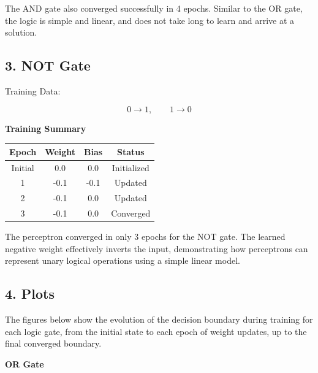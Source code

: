 \documentclass[11pt]{article}
\begin{document}
The AND gate also converged successfully in 4 epochs. Similar to the OR gate, the logic is simple and linear, and does not take long to learn and arrive at a solution.

\vspace{5mm}


\subsection*{3. NOT Gate}

Training Data:

\[
0\rightarrow1,\qquad1\rightarrow0
\]

\vspace{2mm}

\textbf{Training Summary}

\begin{center}
\begin{tabular}{|c|c|c|c|}
\hline
Epoch & Weight & Bias & Status\\
\hline
Initial & 0.0 & 0.0 & Initialized\\
\hline
1 & -0.1 & -0.1 & Updated\\
\hline
2 & -0.1 & 0.0 & Updated\\
\hline
3 & -0.1 & 0.0 & Converged\\
\hline
\end{tabular}
\end{center}

The perceptron converged in only 3 epochs for the NOT gate. The learned negative weight effectively inverts the input, demonstrating how perceptrons can represent unary logical operations using a simple linear model.

\vspace{5mm}


\subsection*{4. Plots}

The figures below show the evolution of the decision boundary during training for each logic gate, from the initial state to each epoch of weight updates, up to the final converged boundary.

\vspace{3mm}

\textbf{OR Gate}
\end{document}

